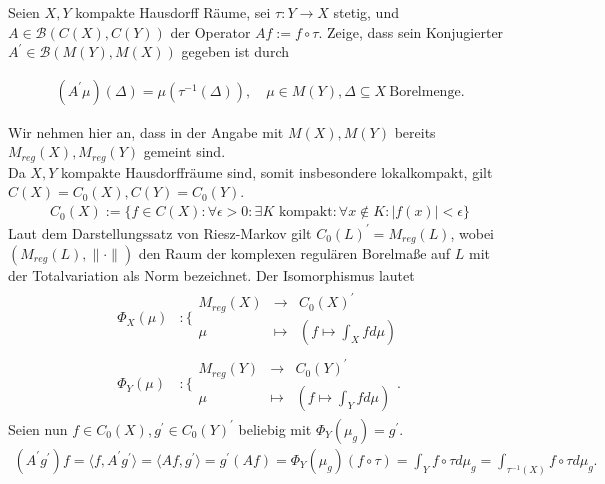 \begin{exercise}

Seien $X, Y$ kompakte Hausdorff Räume, sei $\tau: Y \to X$ stetig, und $A \in \mathcal{B}(C(X), C(Y))$ der Operator $A f := f \circ \tau$.
Zeige, dass sein Konjugierter $A^\prime \in \mathcal{B}(M(Y), M(X))$ gegeben ist durch

\begin{align*}
  (A^\prime \mu)(\Delta) = \mu(\tau^{-1}(\Delta)),
  \quad
  \mu \in M(Y), \Delta \subseteq X ~\text{Borelmenge}.
\end{align*}

\end{exercise}

\begin{solution}
Wir nehmen hier an, dass in der Angabe mit $M(X),M(Y)$ bereits $M_{reg}(X), M_{reg}(Y)$ gemeint sind. \\
Da $X,Y$ kompakte Hausdorffräume sind, somit insbesondere lokalkompakt, gilt $C(X) = C_0(X), C(Y) = C_0(Y)$.
\begin{align*}
  C_0(X) := \{f \in C(X): \forall \epsilon > 0: \exists K \text{ kompakt}:
  \forall x \notin K: |f(x)| < \epsilon\}
\end{align*}
Laut dem Darstellungssatz von Riesz-Markov gilt $C_0(L)^{\prime} = M_{reg}(L)$,
wobei $(M_{reg}(L), \|\cdot\|)$ den Raum der komplexen regulären Borelmaße auf $L$
mit der Totalvariation als Norm bezeichnet.
Der Isomorphismus lautet
\begin{align*}
  \Phi_X(\mu)&: \Bigg\{ \begin{matrix}
    M_{reg}(X) & \to & C_0(X)^{\prime} \\
    \mu & \mapsto & (f \mapsto \int_X f d\mu)
  \end{matrix} \\
  \Phi_Y(\mu)&: \Bigg\{ \begin{matrix}
    M_{reg}(Y) & \to & C_0(Y)^{\prime} \\
    \mu & \mapsto & (f \mapsto \int_Y f d\mu)
  \end{matrix}.
\end{align*}
Seien nun $f \in C_0(X), g^{\prime} \in C_0(Y)^{\prime}$ beliebig mit $\Phi_Y(\mu_g) = g^{\prime}$.
\begin{align*}
  (A^{\prime}g^{\prime})f = \langle f, A^{\prime}g^{\prime} \rangle = \langle A f, g^{\prime} \rangle
  = g^{\prime}(Af) = \Phi_Y(\mu_g)(f \circ \tau)
  = \int_Y f\circ \tau d\mu_g
  = \int_{\tau^{-1}(X)} f \circ \tau d\mu_g.
\end{align*}

\end{solution}
